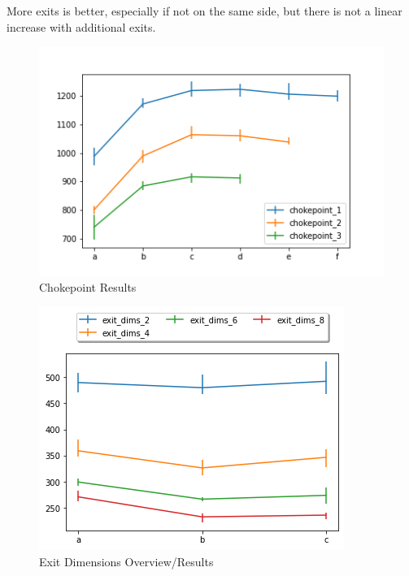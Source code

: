 \documentclass[12pt,letterpaper]{article}
\begin{document}
More exits is better, especially if not on the same side, but there is not a
linear increase with additional exits.

\begin{figure}
  \includegraphics[width=\linewidth]{./figures/chokepoint_graph.png}
  \caption{Chokepoint Results}
\end{figure}
\begin{figure}
  \includegraphics[width=\linewidth]{./figures/exit_dims_graph.png}
  \caption{Exit Dimensions Overview/Results}
\end{figure}
\end{document}
